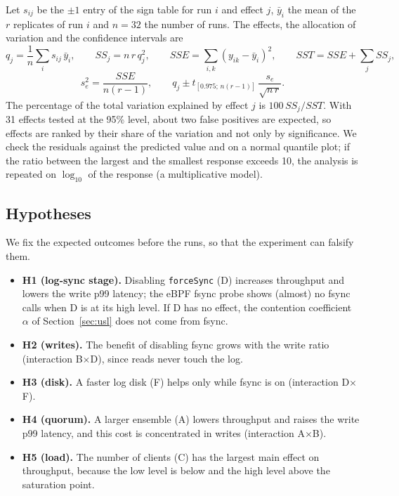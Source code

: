 Let $s_{ij}$ be the $\pm1$ entry of the sign table for run $i$ and effect $j$, $\bar y_i$ the mean of the $r$
replicates of run $i$ and $n=32$ the number of runs. The effects, the allocation of variation and the
confidence intervals are
\begin{equation}
  q_j=\frac1n\sum_{i} s_{ij}\,\bar y_i,\qquad
  SS_j=n\,r\,q_j^2,\qquad
  SSE=\sum_{i,k}(y_{ik}-\bar y_i)^2,\qquad
  SST=SSE+\sum_j SS_j,
\end{equation}
\begin{equation}
  s_e^2=\frac{SSE}{n(r-1)},\qquad
  q_j \pm t_{[0.975;\,n(r-1)]}\,\frac{s_e}{\sqrt{n\,r}} .
\end{equation}
The percentage of the total variation explained by effect $j$ is $100\,SS_j/SST$. With 31 effects tested at the
95\% level, about two false positives are expected, so effects are ranked by their share of the variation and
not only by significance. We check the residuals against the predicted value and on a normal quantile plot; if
the ratio between the largest and the smallest response exceeds 10, the analysis is repeated on $\log_{10}$ of
the response (a multiplicative model).

\subsection{Hypotheses}

We fix the expected outcomes before the runs, so that the experiment can falsify them.
\begin{itemize}
  \item \textbf{H1 (log-sync stage).} Disabling \texttt{forceSync} (D) increases throughput and lowers the
    write p99 latency; the eBPF fsync probe shows (almost) no fsync calls when D is at its high level.
    If D has no effect, the contention coefficient $\alpha$ of Section~\ref{sec:usl} does not come from fsync.
  \item \textbf{H2 (writes).} The benefit of disabling fsync grows with the write ratio (interaction B$\times$D),
    since reads never touch the log.
  \item \textbf{H3 (disk).} A faster log disk (F) helps only while fsync is on (interaction D$\times$F).
  \item \textbf{H4 (quorum).} A larger ensemble (A) lowers throughput and raises the write p99 latency, and
    this cost is concentrated in writes (interaction A$\times$B).
  \item \textbf{H5 (load).} The number of clients (C) has the largest main effect on throughput, because the
    low level is below and the high level above the saturation point.
\end{itemize}

